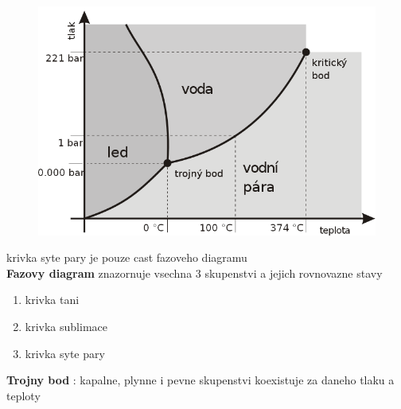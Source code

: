 \documentclass{report}
\begin{document}
\begin{figure}
  \includegraphics[width=\linewidth]{images/Voda-fazovy-diagram.png}
\end{figure}%

krivka syte pary je pouze cast fazoveho diagramu \\[10pt]

\textbf{Fazovy diagram} znazornuje vsechna 3 skupenstvi a jejich rovnovazne stavy \\

\begin{enumerate}
  \item krivka tani
  \item krivka sublimace
  \item krivka syte pary
\end{enumerate}

\textbf{Trojny bod} : kapalne, plynne i pevne skupenstvi koexistuje za daneho tlaku a teploty \\

\vspace{20pt}
\newpage
\end{document}
